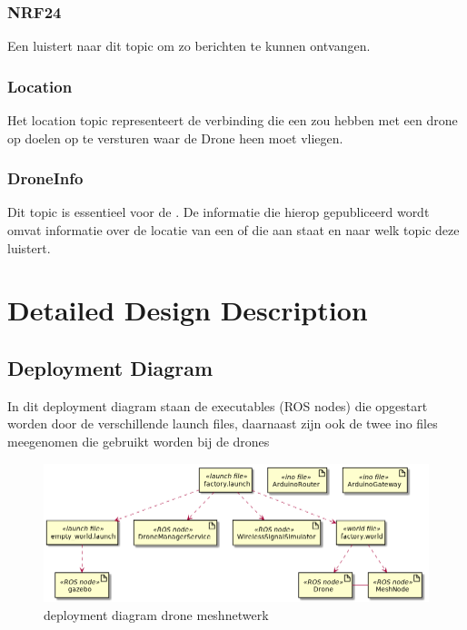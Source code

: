 \documentclass[a4paper, 11pt, oneside]{report}
\begin{document}
\subsection{NRF24}
\label{architectural:ros:topic:NRF24}
Een  luistert naar dit topic om zo berichten te kunnen ontvangen.

\subsection{Location}
\label{architectural:ros:topic:Location}
Het location topic representeert de verbinding die een  zou hebben met een drone op doelen op te versturen waar de Drone heen moet vliegen. 

\subsection{DroneInfo}
\label{architectural:ros:topic:DroneInfo}
Dit topic is essentieel voor de . De informatie die hierop gepubliceerd wordt omvat informatie over de locatie van een  of die aan staat en naar welk  topic deze luistert.

\chapter{Detailed Design Description}
\label{DetailedDesign}

\section{Deployment Diagram}
\label{DetailedDesign:deployment}
In dit deployment diagram staan de executables (ROS nodes) die opgestart worden door de verschillende launch files, daarnaast zijn ook de twee ino files meegenomen die gebruikt worden bij de drones

\begin{figure}[H]
	\begin{center}\includegraphics[width=\linewidth]{UML/out/DeploymentDiagram/DeploymentDiagram/DeploymentDiagram.png}\end{center}
	\caption{deployment diagram drone meshnetwerk}
	\label{fig:deploymentdiagram}
\end{figure}
\end{document}
